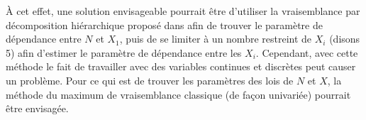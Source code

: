 \documentclass{article}
\begin{document}
		À cet effet, une solution envisageable pourrait être d'utiliser la vraisemblance par décomposition hiérarchique proposé dans \cite{LikelyhoodEstimation} afin de trouver le paramètre de dépendance entre $N$ et $X_1$, puis de se limiter à un nombre restreint de $X_i$ (disons 5) afin d'estimer le paramètre de dépendance entre les $X_i$. Cependant, avec cette méthode le fait de travailler avec des variables continues et discrètes peut causer un problème. Pour ce qui est de trouver les paramètres des lois de $N$ et $X$, la méthode du maximum de vraisemblance classique (de façon univariée) pourrait être envisagée.
	 
		
	\clearpage
	
	
\end{document}
